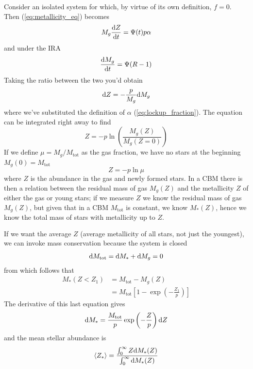 Consider an isolated system for which, by virtue of its own definition, $f=0$. Then (\ref{eq:metallicity_eq}) becomes
\begin{equation*}
    M_{g}\frac{\text{d}Z}{\text{d}t} = \Psi(t)p\alpha
\end{equation*}
and under the IRA
\begin{equation*}
    \frac{\text{d}M_{g}}{\text{d}t} = \Psi(R-1)
\end{equation*}
Taking the ratio between the two you'd obtain 
\begin{equation*}
    \text{d}Z = -\frac{p}{M_{g}}\text{d}M_{g}
\end{equation*}
where we've substituted the definition of $\alpha$ (\ref{eq:lockup_fraction}). The equation can be integrated right away to find 
\begin{equation}
    Z = -p\ln\left(\frac{M_{g}(Z)}{M_{g}(Z=0)}\right)
\end{equation}
If we define $\mu = M_{g}/M_{\text{tot}}$ as the gas fraction, we have no stars at the beginning $M_{g}(0) = M_{\text{tot}}$
\begin{equation}
    Z = -p\ln\mu
    \label{eq:mu_def}
\end{equation}
where $Z$ is the abundance in the gas and newly formed stars. In a CBM there is then a relation between the residual mass of gas $M_{g}(Z)$ and the metallicity $Z$ of either the gas or young stars; if we measure $Z$ we know the residual mass of gas $M_{g}(Z)$, but given that in a CBM $M_{\text{tot}}$ is constant, we know $M_{*}(Z)$, hence we know the total mass of stars with metallicity up to $Z$.
\par If we want the average $Z$ (average metallicity of all stars, not just the youngest), we can invoke mass conservation because the system is closed 
\begin{equation*}
    \text{d}M_{\text{tot}} = \text{d}M_{*}+\text{d}M_{g} = 0
\end{equation*}
from which follows that
\begin{align*}
    M_{*}(Z<Z_{1}) &= M_{\text{tot}}-M_{g}(Z)\\
    &= M_{\text{tot}}\left[1-\exp\left(-\frac{Z_{1}}{p}\right)\right]
\end{align*}
The derivative of this last equation gives 
\begin{equation*}
    \text{d}M_{*} = \frac{M_{\text{tot}}}{p}\exp\left(-\frac{Z}{p}\right)\text{d}Z
\end{equation*}
and the mean stellar abundance is 
\begin{equation}
    \langle Z_{*}\rangle = \frac{\int_{0}^{\infty} Z\text{d}M_{*}(Z)}{\int_{0}^{\infty}\text{d}M_{*}(Z)}
    \label{eq:average_stellar_metallicity}
\end{equation}
